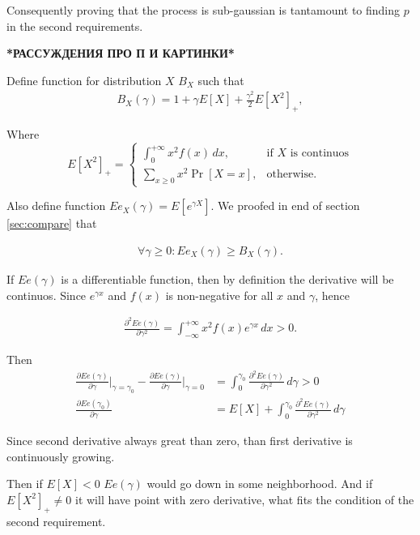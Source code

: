 \documentclass[12pt, a4paper]{article}
\theoremstyle{remark}
\newcommand{\infint}[1]{\int_{-\infty}^{+\infty} #1 \, dx}
\newcommand{\der}[2]{\frac{\partial #1}{\partial #2}}
\begin{document}
Consequently proving that the process is sub-gaussian is tantamount to finding $p$ in the second requirements.

\hfill

\textbf{*РАССУЖДЕНИЯ ПРО П И КАРТИНКИ*}

\hfill

Define function for distribution $X$ $B_X$ such that
\begin{align*}
    B_X(\gamma) = 1 + \gamma E[X] + \frac{\gamma^2}{2} E[X^2]_+,
\end{align*}

Where
\[
E[X^2]_+= 
\begin{cases}
    \int_0^{+\infty} x^2 f(x)\, dx,& \text{if $X$ is continuos}\\
    \sum_{x \geq 0} x^2 \Pr[X = x],              & \text{otherwise}.
\end{cases}
\]

Also define function $Ee_X(\gamma) = E[e^{\gamma X}]$. We proofed in end of section \ref*{sec:compare} that

\begin{align*}
    \forall \gamma\geq 0: Ee_X(\gamma) \geq B_X(\gamma).
\end{align*}

If $Ee(\gamma)$ is a differentiable function, then by definition the derivative will be continuos. Since $e^{\gamma x}$ and $f(x)$ is non-negative for all $x$ and $\gamma$, hence

\begin{align*}
    \frac{\partial^2 Ee(\gamma)}{\partial\gamma^2} = \infint{x^2 f(x) e^{\gamma x}} > 0.
\end{align*}

Then
\begin{align*}
    \der{Ee(\gamma)}{\gamma} \Big|_{\gamma = \gamma_0} - \der{Ee(\gamma)}{\gamma}\Big|_{\gamma = 0} &= \int_0^{\gamma_0} \frac{\partial^2 Ee(\gamma)}{\partial\gamma^2}\, d\gamma > 0 \\
    \der{Ee\left(\gamma_0\right)}{\gamma} &= E[X] + \int_0^{\gamma_0} \frac{\partial^2 Ee(\gamma)}{\partial\gamma^2}\, d\gamma
\end{align*}

Since second derivative always great than zero, than first derivative is continuously growing.

Then if $E[X] < 0$ $Ee(\gamma)$ would go down in some neighborhood. And if $E[X^2]_+ \neq 0$ it will have point with zero derivative, what fits the condition of the second requirement.
\end{document}

